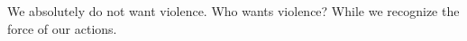 

We absolutely do not want violence.  Who wants violence?  While we
recognize the force of our actions.

\bye
